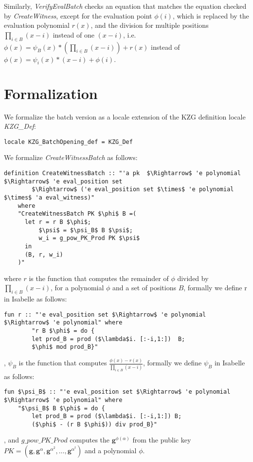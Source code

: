 Similarly, \textit{VerifyEvalBatch} checks an equation that matches the equation checked by \textit{CreateWitness}, except for the evaluation point $\phi(i)$, which is replaced by the evaluation polynomial $r(x)$, and the division for multiple positions $\prod_{i\in B}^{}(x-i)$ instead of one $(x-i)$, i.e. $\phi(x)=\psi_B(x)*(\prod_{i\in B}^{}(x-i)) + r(x)$ instead of $\phi(x)=\psi_i(x)*(x-i) + \phi(i)$.

\section{Formalization}
We formalize the batch version as a locale extension of the KZG definition locale \textit{KZG\_Def}: 
\begin{lstlisting}[language=isabelle]
    locale KZG_BatchOpening_def = KZG_Def 
\end{lstlisting}

We formalize \textit{CreateWitnessBatch} as follows: 
\begin{lstlisting}[language=isabelle]
    definition CreateWitnessBatch :: "'a pk  $\Rightarrow$ 'e polynomial $\Rightarrow$ 'e eval_position set 
        $\Rightarrow$ ('e eval_position set $\times$ 'e polynomial $\times$ 'a eval_witness)"
    where
    "CreateWitnessBatch PK $\phi$ B =( 
      let r = r B $\phi$;
          $\psi$ = $\psi_B$ B $\psi$; 
          w_i = g_pow_PK_Prod PK $\psi$
      in
      (B, r, w_i)
    )"     
\end{lstlisting}
where $r$ is the function that computes the remainder of $\phi$ divided by $\prod_{i\in B}^{}(x-i)$, for a polynomial $\phi$ and a set of positions $B$, formally we define r in Isabelle as follows: 
\begin{lstlisting}[language=isabelle]
    fun r :: "'e eval_position set $\Rightarrow$ 'e polynomial $\Rightarrow$ 'e polynomial" where
        "r B $\phi$ = do {
        let prod_B = prod ($\lambda$i. [:-i,1:])  B;
        $\phi$ mod prod_B}"    
\end{lstlisting},
$\psi_B$ is the function that computes $\frac{\phi(x)-r(x)}{\prod_{i\in B}^{}(x-i)}$, formally we define $\psi_B$ in Isabelle as follows: 
\begin{lstlisting}[language=isabelle]
    fun $\psi_B$ :: "'e eval_position set $\Rightarrow$ 'e polynomial $\Rightarrow$ 'e polynomial" where
    "$\psi_B$ B $\phi$ = do {
        let prod_B = prod ($\lambda$i. [:-i,1:]) B;
        ($\phi$ - (r B $\phi$)) div prod_B}"
\end{lstlisting},
and $g\_pow\_PK\_Prod$ computes the $\mathbf{g}^{\phi(\alpha)}$ from the public key $PK = (\mathbf{g}, \mathbf{g}^\alpha, \mathbf{g}^{\alpha^2}, \dots, \mathbf{g}^{\alpha^t})$ and a polynomial $\phi$.

